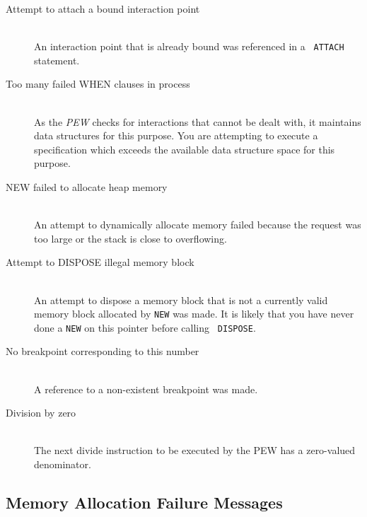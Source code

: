 \begin{description}
\item[Attempt to attach a bound interaction point]\mbox{}\\
An interaction point that is already bound was referenced in a {\tt
ATTACH} statement.

\item[Too many failed WHEN clauses in process]\mbox{}\\
As the {\em PEW} checks for interactions that cannot be dealt with,
it maintains data structures for this purpose. You are attempting to
execute a specification which exceeds the available data structure
space for this purpose.

\item[NEW failed to allocate heap memory]\mbox{}\\
An attempt to dynamically allocate memory failed because the
request was too large or the stack is close to overflowing.

\item[Attempt to DISPOSE illegal memory block]\mbox{}\\
An attempt to dispose a memory block that is not a currently valid
memory block allocated by {\tt NEW} was made. It is likely that you
have never done a {\tt NEW} on this pointer before calling {\tt
DISPOSE}.

\item[No breakpoint corresponding to this number]\mbox{}\\
A reference to a non-existent breakpoint was made.

\item[Division by zero]\mbox{}\\
The next divide instruction to be executed by the PEW has a 
zero-valued denominator.
\end{description}

\subsection[Memory Allocation Failure Messages]{Memory Allocation Failure
Messages}

